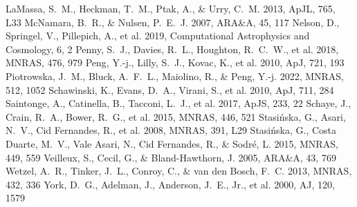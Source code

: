 \documentclass[twocolumn]{aastex631}
\begin{document}
\begin{thebibliography}{}
 LaMassa, S.~M., Heckman, T.~M., Ptak, A., \& Urry, C.~M. 2013, ApJL, 765, L33
 McNamara, B.~R., \& Nulsen, P.~E.~J. 2007, ARA\&A, 45, 117
 Nelson, D., Springel, V., Pillepich, A., et al. 2019, Computational Astrophysics and Cosmology, 6, 2
 Penny, S.~J., Davies, R.~L., Houghton, R.~C.~W., et al. 2018, MNRAS, 476, 979
 Peng, Y.-j., Lilly, S.~J., Kovac, K., et al. 2010, ApJ, 721, 193
 Piotrowska, J.~M., Bluck, A.~F.~L., Maiolino, R., \& Peng, Y.-j. 2022, MNRAS, 512, 1052
 Schawinski, K., Evans, D.~A., Virani, S., et al. 2010, ApJ, 711, 284
 Saintonge, A., Catinella, B., Tacconi, L.~J., et al. 2017, ApJS, 233, 22
 Schaye, J., Crain, R.~A., Bower, R.~G., et al. 2015, MNRAS, 446, 521
 Stasi{\'n}ska, G., Asari, N.~V., Cid Fernandes, R., et al. 2008, MNRAS, 391, L29
 Stasi{\'n}ska, G., Costa Duarte, M.~V., Vale Asari, N., Cid Fernandes, R., \& Sodr{\'e}, L. 2015, MNRAS, 449, 559
 Veilleux, S., Cecil, G., \& Bland-Hawthorn, J. 2005, ARA\&A, 43, 769
 Wetzel, A.~R., Tinker, J.~L., Conroy, C., \& van den Bosch, F.~C. 2013, MNRAS, 432, 336
 York, D.~G., Adelman, J., Anderson, J.~E., Jr., et al. 2000, AJ, 120, 1579
\end{thebibliography}
\end{document}
